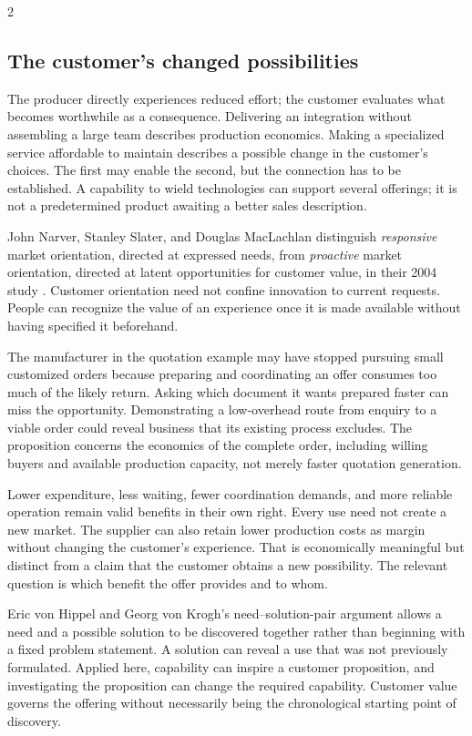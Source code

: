 \begin{multicols}{2}
\subsection{The customer's changed
possibilities}\label{the-customers-changed-possibilities}

The producer directly experiences reduced effort; the customer evaluates
what becomes worthwhile as a consequence. Delivering an integration
without assembling a large team describes production economics. Making a
specialized service affordable to maintain describes a possible change
in the customer's choices. The first may enable the second, but the
connection has to be established. A capability to wield technologies can
support several offerings; it is not a predetermined product awaiting a
better sales description.

John Narver, Stanley Slater, and Douglas MacLachlan distinguish
\emph{responsive} market orientation, directed at expressed needs, from
\emph{proactive} market orientation, directed at latent opportunities
for customer value, in their 2004 study \citep{narver2004orientation}.
Customer orientation need not confine innovation to current requests.
People can recognize the value of an experience once it is made
available without having specified it beforehand.

The manufacturer in the quotation example may have stopped pursuing
small customized orders because preparing and coordinating an offer
consumes too much of the likely return. Asking which document it wants
prepared faster can miss the opportunity. Demonstrating a low-overhead
route from enquiry to a viable order could reveal business that its
existing process excludes. The proposition concerns the economics of the
complete order, including willing buyers and available production
capacity, not merely faster quotation generation.

Lower expenditure, less waiting, fewer coordination demands, and more
reliable operation remain valid benefits in their own right. Every use
need not create a new market. The supplier can also retain lower
production costs as margin without changing the customer's experience.
That is economically meaningful but distinct from a claim that the
customer obtains a new possibility. The relevant question is which
benefit the offer provides and to whom.

Eric von Hippel and Georg von Krogh's need--solution-pair argument
\citep{vonhippel2016needsolution} allows a need and a possible solution
to be discovered together rather than beginning with a fixed problem
statement. A solution can reveal a use that was not previously
formulated. Applied here, capability can inspire a customer proposition,
and investigating the proposition can change the required capability.
Customer value governs the offering without necessarily being the
chronological starting point of discovery.


\end{multicols}

